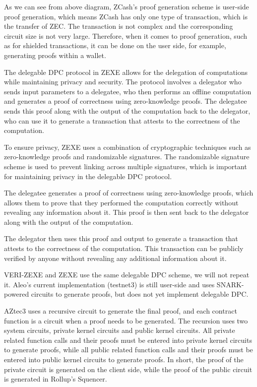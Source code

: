 As we can see from above diagram, ZCash's proof generation scheme is user-side proof generation, which means ZCash has only one type of transaction, which is the transfer of ZEC. The transaction is not complex and the corresponding circuit size is not very large. Therefore, when it comes to proof generation, such as for shielded transactions, it can be done on the user side, for example, generating proofs within a wallet.

The delegable DPC protocol in ZEXE \cite{cryptoeprint:2018/962} allows for the delegation of computations while maintaining privacy and security. The protocol involves a delegator who sends input parameters to a delegatee, who then performs an offline computation and generates a proof of correctness using zero-knowledge proofs. The delegatee sends this proof along with the output of the computation back to the delegator, who can use it to generate a transaction that attests to the correctness of the computation.

To ensure privacy, ZEXE uses a combination of cryptographic techniques such as zero-knowledge proofs and randomizable signatures. The randomizable signature scheme is used to prevent linking across multiple signatures, which is important for maintaining privacy in the delegable DPC protocol.

The delegatee generates a proof of correctness using zero-knowledge proofs, which allows them to prove that they performed the computation correctly without revealing any information about it. This proof is then sent back to the delegator along with the output of the computation.

The delegator then uses this proof and output to generate a transaction that attests to the correctness of the computation. This transaction can be publicly verified by anyone without revealing any additional information about it.

VERI-ZEXE and ZEXE use the same delegable DPC scheme, we will not repeat it. Aleo's current implementation (testnet3) is still user-side and uses SNARK-powered circuits to generate proofs, but does not yet implement delegable DPC.

AZtec3 \cite{website:Aztec3} uses a recursive circuit to generate the final proof, and each contract function is a circuit when a proof needs to be generated. The recursion uses two system circuits, private kernel circuits and public kernel circuits. All private related function calls and their proofs must be entered into private kernel circuits to generate proofs, while all public related function calls and their proofs must be entered into public kernel circuits to generate proofs. In short, the proof of the private circuit is generated on the client side, while the proof of the public circuit is generated in Rollup's Squencer.

